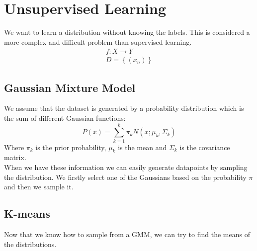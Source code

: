 \section{Unsupervised Learning}
We want to learn a distribution without knowing the labels. This is considered a more complex and difficult problem than supervised learning.
\begin{equation}
    \begin{multlined}
        f: X \xrightarrow{} Y \\
        D = \left\{ (x_{n}) \right\}
    \end{multlined}
\end{equation}
\subsection{Gaussian Mixture Model}
We assume that the dataset is generated by a probability distribution which is the sum of different Gaussian functions:
\begin{equation}
    P(x) = \sum_{k=1}^{k}\pi_{k}N\left(x; \mu_{k}, \Sigma_{k}\right)
\end{equation}
Where $\pi_{k}$ is the prior probability, $\mu_{k}$ is the mean and $\Sigma_{k}$ is the covariance matrix.\\
When we have these information we can easily generate datapoints by sampling the distribution. We firstly select one of the Gaussians based on the probability $\pi$ and then we sample it.

\subsection{K-means}
Now that we know how to sample from a GMM, we can try to find the means of the distributions.

